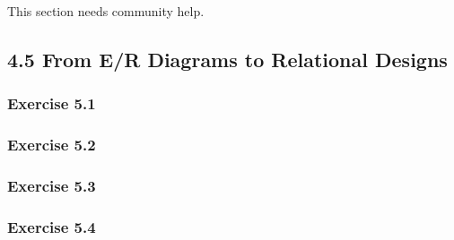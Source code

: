 \documentclass[../../main.tex]{subfiles}
\begin{document}
This section needs community help.

\subsection{4.5 From E/R Diagrams to Relational Designs}

\subsubsection*{Exercise 5.1}

\subsubsection*{Exercise 5.2}

\subsubsection*{Exercise 5.3}

\subsubsection*{Exercise 5.4}
\end{document}
